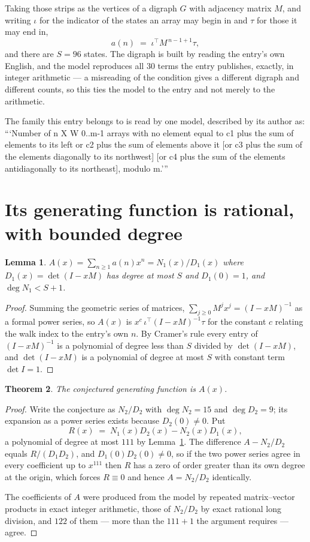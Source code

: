 \documentclass[11pt,a4paper]{article}
\theoremstyle{plain}
\newtheorem{theorem}{Theorem}
\newtheorem{lemma}[theorem]{Lemma}
\theoremstyle{definition}
\begin{document}
Taking those strips as the vertices of a digraph $G$ with adjacency matrix $M$, and writing
$\iota$ for the indicator of the states an array may begin in and $\tau$ for those it may end
in,
\[
a(n)\;=\;\iota^{\!\top}M^{\,n-1+1}\tau ,
\]
and there are $S=96$ states. The digraph is built by reading the entry's own English, and the
model reproduces all $30$ terms the entry publishes, exactly, in integer arithmetic --- a
misreading of the condition gives a different digraph and different counts, so this ties the
model to the entry and not merely to the arithmetic.

The family this entry belongs to is read by one model, described by its author as: ```Number of n X W 0..m-1 arrays with no element equal to c1 plus the sum of elements to its left or c2 plus the sum of elements above it [or c3 plus the sum of the elements diagonally to its northwest] [or c4 plus the sum of the elements antidiagonally to its northeast], modulo m.'''


\section{Its generating function is rational, with bounded degree}

\begin{lemma}\label{lem:rat}
$A(x)=\sum_{n\ge1}a(n)x^n=N_1(x)/D_1(x)$ where $D_1(x)=\det(I-xM)$ has degree at most
$S$ and $D_1(0)=1$, and $\deg N_1<S+1$.
\end{lemma}

\begin{proof}
Summing the geometric series of matrices, $\sum_{j\ge0}M^jx^j=(I-xM)^{-1}$ as a formal
power series, so $A(x)$ is $x^{c}\,\iota^{\!\top}(I-xM)^{-1}\tau$ for the constant $c$
relating the walk index to the entry's own $n$. By Cramer's rule every entry of
$(I-xM)^{-1}$ is a polynomial of degree less than $S$ divided by $\det(I-xM)$, and
$\det(I-xM)$ is a polynomial of degree at most $S$ with constant term $\det I=1$.
\end{proof}

\begin{theorem}
The conjectured generating function is $A(x)$.
\end{theorem}

\begin{proof}
Write the conjecture as $N_2/D_2$ with $\deg N_2=15$ and $\deg D_2=9$; its expansion as a
power series exists because $D_2(0)\neq0$. Put
\[
R(x)\;=\;N_1(x)D_2(x)-N_2(x)D_1(x),
\]
a polynomial of degree at most $111$ by Lemma~\ref{lem:rat}. The difference
$A-N_2/D_2$ equals $R/(D_1D_2)$, and $D_1(0)D_2(0)\neq0$, so if the two power series agree in
every coefficient up to $x^{111}$ then $R$ has a zero of order greater than its own
degree at the origin, which forces $R\equiv0$ and hence $A=N_2/D_2$ identically.

The coefficients of $A$ were produced from the model by repeated matrix--vector products in
exact integer arithmetic, those of $N_2/D_2$ by exact rational long division, and $122$
of them --- more than the $111+1$ the argument requires --- agree.
\end{proof}
\end{document}
